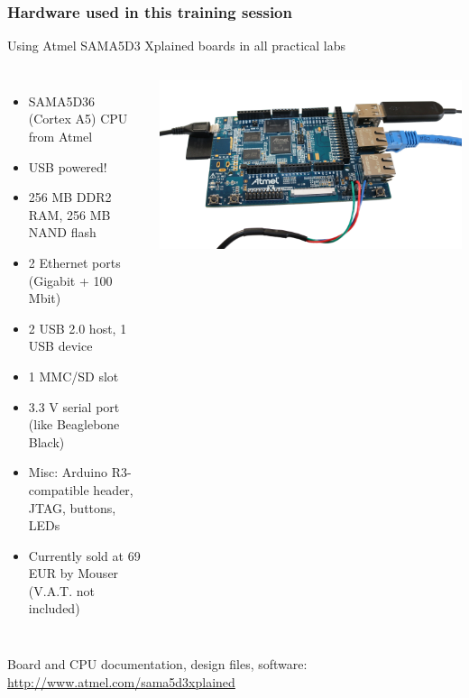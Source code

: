 \begin{frame}
\frametitle{Hardware used in this training session}
  Using Atmel SAMA5D3 Xplained boards in all practical labs
  \begin{columns}
    {\footnotesize
    \begin{itemize}
	\item SAMA5D36 (Cortex A5) CPU from Atmel
	\item USB powered!
	\item 256 MB DDR2 RAM, 256 MB NAND flash
	\item 2 Ethernet ports (Gigabit + 100 Mbit)
	\item 2 USB 2.0 host, 1 USB device
	\item 1 MMC/SD slot
	\item 3.3 V serial port (like Beaglebone Black)
	\item Misc: Arduino R3-compatible header, JTAG, buttons, LEDs
	\item Currently sold at 69 EUR by Mouser (V.A.T. not included)
    \end{itemize}
    }
    \includegraphics[width=\textwidth]{slides/xplained-board/xplained-board.png}
  \end{columns}
  \vspace{1em}
  {\small
  Board and CPU documentation, design files, software:
  \url{http://www.atmel.com/sama5d3xplained}
  }
\end{frame}
